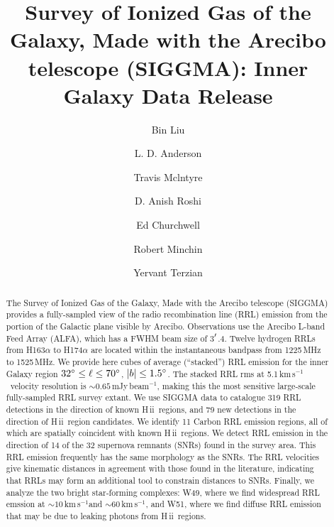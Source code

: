 \documentclass[manuscript]{aastex61}
\newcommand{\hii}{{\rm H\,}{{\sc ii}}}
\newcommand{\kms}{\,km\,s$^{-1}$}
\begin{document}
\title{Survey of Ionized Gas of the Galaxy, Made with the Arecibo telescope (SIGGMA): Inner Galaxy Data Release}

\author[0000-0002-1311-8839]{Bin Liu}
\author{L. D. Anderson}
\author{Travis Mclntyre}
\author{D. Anish Roshi}
\author{Ed Churchwell}
\author{Robert Minchin}
\author{Yervant Terzian}

\begin{abstract}
The Survey of Ionized Gas of the Galaxy, Made with the Arecibo telescope (SIGGMA) provides a fully-sampled view of the radio recombination line (RRL) emission from the portion of the Galactic plane visible by Arecibo.
Observations use the Arecibo L-band Feed Array (ALFA), which has a FWHM beam size of 3$\mbox{$^\prime$}$.4. 
Twelve hydrogen RRLs from H163$\alpha$ to H174$\alpha$ are located within the instantaneous bandpass from 1225\,MHz to 1525\,MHz.
We provide here cubes of average (``stacked'') RRL emission for the inner Galaxy region $32\mbox{$^\circ$}\le\ell\le 70\mbox{$^\circ$}$, $|b|\le1.5\mbox{$^\circ$}$.
The stacked RRL rms at 5.1\kms\ velocity resolution is $\sim0.65$\,mJy\,beam$^{-1}$, making this the most sensitive large-scale fully-sampled RRL survey extant.
We use SIGGMA data to catalogue 319 RRL detections in the direction of known \hii\ regions, and 79 new detections in the direction of \hii\ region candidates. 
We identify 11 Carbon RRL emission regions, all of which are spatially coincident with known \hii\ regions. 
We detect RRL emission in the direction of 14 of the 32 supernova remnants (SNRs) found in the survey area.
This RRL emission frequently has the same morphology as the SNRs. The RRL velocities give kinematic distances in agreement with those found in the literature, indicating that RRLs may form an additional tool to constrain distances to SNRs.
Finally, we analyze the two bright star-forming complexes: W49, where we find widespread RRL emssion at $\sim10$\kms and $\sim60$\kms, and W51, where we find diffuse RRL emission that may be due to leaking photons from \hii\ regions. 
\end{abstract}
\end{document}
